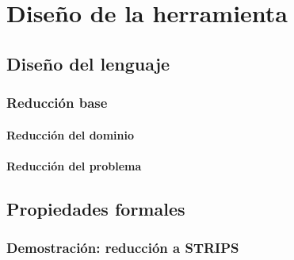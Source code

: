 
\chapter{Diseño de la herramienta}
\label{Chapter2}

\section{Diseño del lenguaje}

\subsection{Reducción base}
\subsubsection{Reducción del dominio}
\subsubsection{Reducción del problema}

\section{Propiedades formales}
\subsection{Demostración: reducción a STRIPS}
